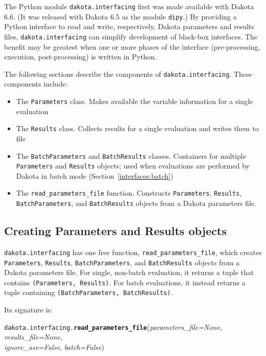 The Python module {\tt dakota.interfacing} first was made available with Dakota 6.6. (It was released with 
Dakota 6.5 as the module {\tt dipy}.) By providing a Python interface to read and write, respectively,
Dakota parameters and results files, {\tt dakota.interfacing} can simplify development of black-box
interfaces. The benefit may be greatest when one or more phases of the interface (pre-processing, execution,
post-processing) is written in Python.

The following sections describe the components of {\tt dakota.interfacing}. These components include:
\begin{itemize}
  \item The {\tt Parameters} class. Makes available the variable information for a single evaluation
  \item The {\tt Results} class. Collects results for a single evaluation and writes them to file 
  \item The {\tt BatchParameters} and {\tt BatchResults} classes. Containers for multiple {\tt Parameters} and 
	  {\tt Results} objects; used when evaluations are performed by Dakota in batch mode (Section~\ref{interfaces:batch})
  \item The {\tt read\_parameters\_file} function. Constructs {\tt Parameters}, 
        {\tt Results}, {\tt BatchParameters}, and {\tt BatchResults} objects from a Dakota 
        parameters file.
\end{itemize}

\subsection{Creating Parameters and Results objects}

{\tt dakota.interfacing} has one free function, {\tt read\_parameters\_file}, which creates {\tt Parameters}, 
{\tt Results}, {\tt BatchParameters}, and {\tt BatchResults} objects from a Dakota parameters file. For
single, non-batch evaluation, it returns a tuple that contains {\tt (Parameters, Results)}. For batch evaluations,
it instead returns a tuple containing {\tt (BatchParameters, BatchResults)}.

Its signature is:

\label{index:dakota.interfacing.read_parameters_file}\texttt{dakota.interfacing.}\textbf{\texttt{read\_parameters\_file}}({\emph{parameters\_file=None}, \emph{results\_file=None},\\\emph{ignore\_asv=False}, \emph{batch=False}}){}


